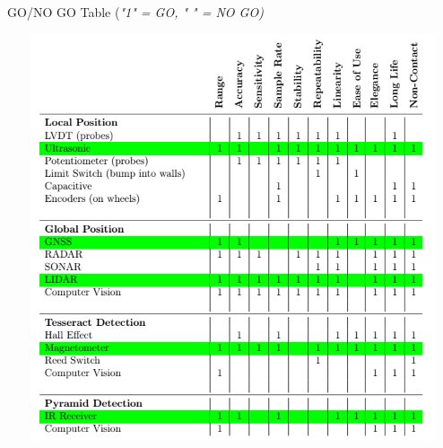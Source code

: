 \documentclass[12pt]{article}
\begin{document}
\vspace{0.00mm}
\begin{table}[htb!]
\label{tab:go_nogo}
\begin{center}
\caption{GO/NO GO Table (\textit{"1" = GO, " " = NO GO)}}
\includegraphics[height =12cm, width = 15cm]{Figures/go_nogo}
\end{center}
\end{table}
\end{document}
